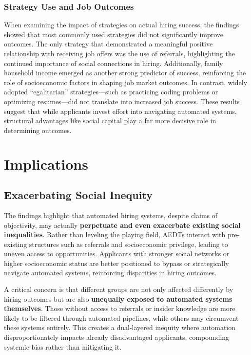 \subsubsection{Strategy Use and Job Outcomes}
When examining the impact of strategies on actual hiring success, the findings showed that most commonly used strategies did not significantly improve outcomes. The only strategy that demonstrated a meaningful positive relationship with receiving job offers was the use of referrals, highlighting the continued importance of social connections in hiring. Additionally, family household income emerged as another strong predictor of success, reinforcing the role of socioeconomic factors in shaping job market outcomes. In contrast, widely adopted “egalitarian” strategies—such as practicing coding problems or optimizing resumes—did not translate into increased job success. These results suggest that while applicants invest effort into navigating automated systems, structural advantages like social capital play a far more decisive role in determining outcomes.

\section{Implications}
\subsection{Exacerbating Social Inequity}
The findings highlight that automated hiring systems, despite claims of objectivity, may actually \textbf{perpetuate and even exacerbate existing social inequalities}. Rather than leveling the playing field, AEDTs interact with pre-existing structures such as referrals and socioeconomic privilege, leading to uneven access to opportunities. Applicants with stronger social networks or higher socioeconomic status are better positioned to bypass or strategically navigate automated systems, reinforcing disparities in hiring outcomes.

A critical concern is that different groups are not only affected differently by hiring outcomes but are also \textbf{unequally exposed to automated systems themselves}. Those without access to referrals or insider knowledge are more likely to be filtered through automated pipelines, while others may circumvent these systems entirely. This creates a dual-layered inequity where automation disproportionately impacts already disadvantaged applicants, compounding systemic bias rather than mitigating it.

